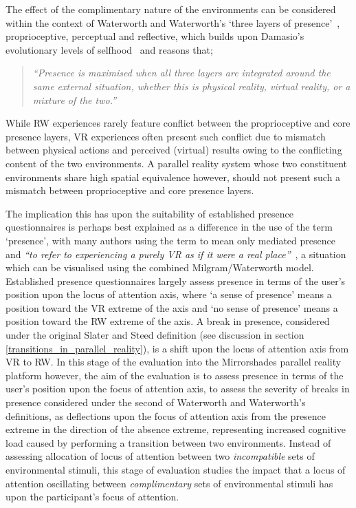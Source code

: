 The effect of the complimentary nature of the environments can be considered within the context of Waterworth and Waterworth's `three layers of presence'~\cite{Mantovani2010}, proprioceptive, perceptual and reflective, which builds upon Damasio's evolutionary levels of selfhood~\cite{Damasio1999} and reasons that;

\begin{quote}
\textit{``Presence is maximised when all three layers are integrated around the same external situation, whether this is physical reality, virtual reality, or a mixture of the two.''}~\cite{Mantovani2010}
\end{quote}

While RW experiences rarely feature conflict between the proprioceptive and core presence layers, VR experiences often present such conflict due to mismatch between physical actions and perceived (virtual) results owing to the conflicting content of the two environments. A parallel reality system whose two constituent environments share high spatial equivalence however, should not present such a mismatch between proprioceptive and core presence layers.

The implication this has upon the suitability of established presence questionnaires is perhaps best explained as a difference in the use of the term `presence', with many authors using the term to mean only mediated presence~\cite{Mantovani2010} and \textit{``to refer to experiencing a purely VR as if it were a real place''}~\cite{Steed2014}, a situation which can be visualised using the combined Milgram/Waterworth model. Established presence questionnaires largely assess presence in terms of the user's position upon the locus of attention axis, where `a sense of presence' means a position toward the VR extreme of the axis and `no sense of presence' means a position toward the RW extreme of the axis. A break in presence, considered under the original Slater and Steed definition (see discussion in section \ref{transitions_in_parallel_reality}), is a shift upon the locus of attention axis from VR to RW. In this stage of the evaluation into the Mirrorshades parallel reality platform however, the aim of the evaluation is to assess presence in terms of the user's position upon the focus of attention axis, to assess the severity of breaks in presence considered under the second of Waterworth and Waterworth's definitions, as deflections upon the focus of attention axis from the presence extreme in the direction of the absence extreme, representing increased cognitive load caused by performing a transition between two environments. Instead of assessing allocation of locus of attention between two \textit{incompatible} sets of environmental stimuli, this stage of evaluation studies the impact that a locus of attention oscillating between \textit{complimentary} sets of environmental stimuli has upon the participant's focus of attention.

